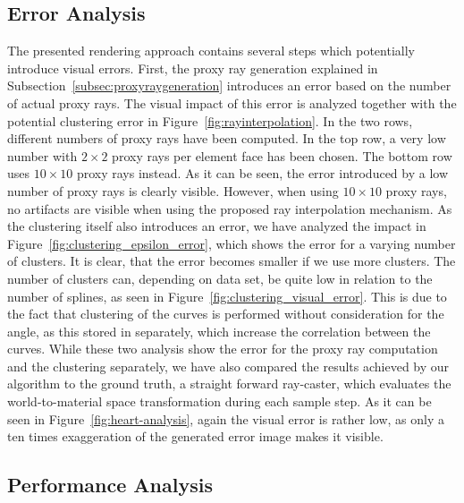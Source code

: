 \documentclass[review,journal]{vgtc}         %
\begin{document}
\subsection{Error Analysis}\label{subsec:error}
The presented rendering approach contains several steps which potentially introduce visual errors. First, the proxy ray generation explained in Subsection~\ref{subsec:proxyraygeneration} introduces an error based on the number of actual proxy rays. The visual impact of this error is analyzed together with the potential clustering error in Figure~\ref{fig:rayinterpolation}. In the two rows, different numbers of proxy rays have been computed. In the top row, a very low number with $2 \times 2$ proxy rays per element face has been chosen. The bottom row uses $10 \times 10$ proxy rays instead. As it can be seen, the error introduced by a low number of proxy rays is clearly visible. However, when using $10 \times 10$ proxy rays, no artifacts are visible when using the proposed ray interpolation mechanism. As the clustering itself also introduces an error, we have analyzed the impact in Figure~\ref{fig:clustering_epsilon_error}, which shows the error for a varying number of clusters. It is clear, that the error becomes smaller if we use more clusters. The number of clusters can, depending on data set, be quite low in relation to the number of splines, as seen in Figure~\ref{fig:clustering_visual_error}. This is due to the fact that clustering of the curves is performed without consideration for the angle, as this stored in separately, which increase the correlation between the curves. While these two analysis show the error for the proxy ray computation and the clustering separately, we have also compared the results achieved by our algorithm to the ground truth, a straight forward ray-caster, which evaluates the world-to-material space transformation during each sample step. As it can be seen in Figure~\ref{fig:heart-analysis}, again the visual error is rather low, as only a ten times exaggeration of the generated error image makes it visible.


\subsection{Performance Analysis}\label{subsec:performance}
\end{document}
